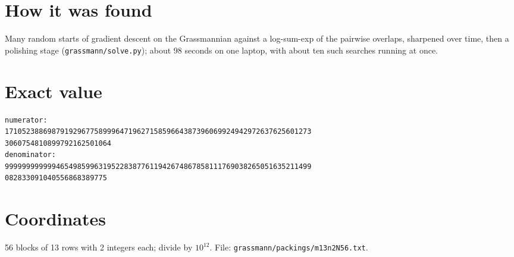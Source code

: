 \documentclass[11pt,a4paper]{article}
\begin{document}
\section{How it was found}
Many random starts of gradient descent on the Grassmannian against a log-sum-exp of the pairwise overlaps, sharpened over time, then a polishing stage (\texttt{grassmann/solve.py}); about 98 seconds on one laptop, with about ten such searches running at once.


\appendix
\section{Exact value}
{\small
\begin{verbatim}
numerator:
171052388698791929677589996471962715859664387396069924942972637625601273
3060754810899792162501064
denominator:
999999999999465498599631952283877611942674867858111769038265051635211499
082833091040556868389775
\end{verbatim}}

\section{Coordinates}
56 blocks of 13 rows with 2 integers each; divide by $10^{12}$. File: \texttt{grassmann/packings/m13n2N56.txt}.
{\tiny
\begin{multicols}{4}
\end{multicols}}
\end{document}
